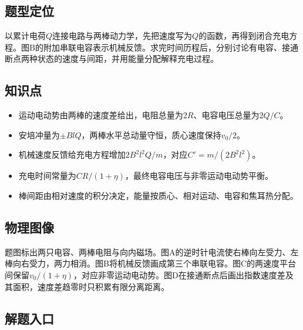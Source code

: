 \documentclass[UTF8,fontset=fandol,a4paper,11pt]{ctexart}
\begin{document}


\subsection*{题型定位}

以累计电荷$Q$连接电路与两棒动力学，先把速度写为$Q$的函数，再得到闭合充电方程。图B的附加串联电容表示机械反馈。求完时间历程后，分别讨论有电容、接通断点两种状态的速度与间距，并用能量分配解释充电过程。



\subsection*{知识点}

\begin{itemize}
\item 运动电动势由两棒的速度差给出，电阻总量为$2R$、电容电压总量为$2Q/C$。
\item 安培冲量为$\pm BlQ$，两棒水平总动量守恒，质心速度保持$v_0/2$。
\item 机械速度反馈给充电方程增加$2B^2l^2Q/m$，对应$C'=m/(2B^2l^2)$。
\item 充电时间常量为$CR/(1+\eta)$，最终电容电压与非零运动电动势平衡。
\item 棒间距由相对速度的积分决定，能量按质心、相对运动、电容和焦耳热分配。
\end{itemize}



\subsection*{物理图像}

题图标出两只电容、两棒电阻与向内磁场。图A的逆时针电流使右棒向左受力、左棒向右受力，两力相消。图B将机械反馈画成第三个串联电容。图C的两速度平台间保留$v_0/(1+\eta)$，对应非零运动电动势。图D在接通断点后画出指数速度差及其面积，速度差趋零时只积累有限分离距离。



\subsection*{解题入口}
\end{document}
